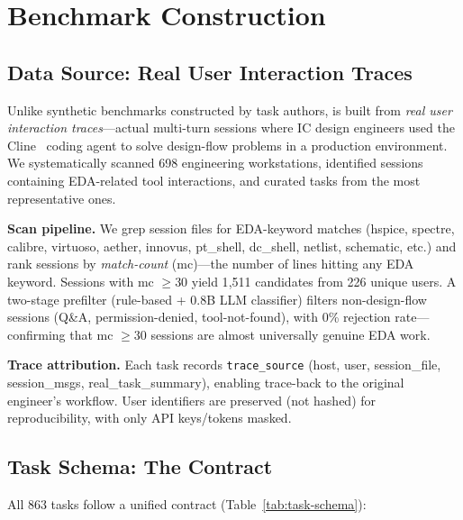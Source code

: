 \section{Benchmark Construction}
\label{sec:benchmark}

\subsection{Data Source: Real User Interaction Traces}
\label{sec:data-source}

Unlike synthetic benchmarks constructed by task authors, \bench{} is built from \emph{real user interaction traces}---actual multi-turn sessions where IC design engineers used the Cline~\cite{cline2026} coding agent to solve design-flow problems in a production environment. We systematically scanned 698 engineering workstations, identified sessions containing EDA-related tool interactions, and curated tasks from the most representative ones.

\textbf{Scan pipeline.} We grep session files for EDA-keyword matches (hspice, spectre, calibre, virtuoso, aether, innovus, pt\_shell, dc\_shell, netlist, schematic, etc.) and rank sessions by \emph{match-count} (mc)---the number of lines hitting any EDA keyword. Sessions with mc $\geq 30$ yield 1{,}511 candidates from 226 unique users. A two-stage prefilter (rule-based + 0.8B LLM classifier) filters non-design-flow sessions (Q\&A, permission-denied, tool-not-found), with 0\% rejection rate---confirming that mc $\geq 30$ sessions are almost universally genuine EDA work.

\textbf{Trace attribution.} Each task records \texttt{trace\_source} (host, user, session\_file, session\_msgs, real\_task\_summary), enabling trace-back to the original engineer's workflow. User identifiers are preserved (not hashed) for reproducibility, with only API keys/tokens masked.

\subsection{Task Schema: The \mode{} Contract}
\label{sec:task-schema}

All 863 tasks follow a unified \mode{} contract (Table~\ref{tab:task-schema}):

